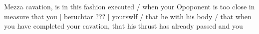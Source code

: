 
Mezza cavation, is in this fashion executed / when your Opoponent is
too close in measure that you [ beruchtar ??? ] yourswlf / that he
with his body / that when you have completed your cavation, that his
thrust has already passed and you

